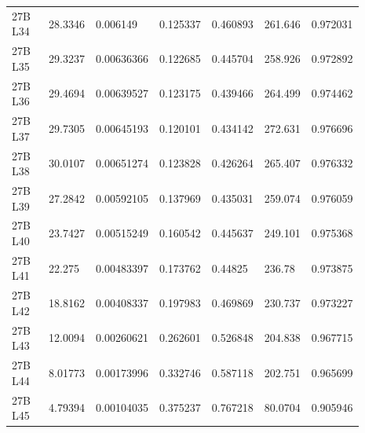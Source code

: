 \begin{longtable}{@{}L{0.13\linewidth}L{0.11\linewidth}L{0.13\linewidth}L{0.13\linewidth}L{0.13\linewidth}L{0.13\linewidth}L{0.13\linewidth}@{}}
27B L34 & 28.3346 & 0.006149 & 0.125337 & 0.460893 & 261.646 & 0.972031 \\
27B L35 & 29.3237 & 0.00636366 & 0.122685 & 0.445704 & 258.926 & 0.972892 \\
27B L36 & 29.4694 & 0.00639527 & 0.123175 & 0.439466 & 264.499 & 0.974462 \\
27B L37 & 29.7305 & 0.00645193 & 0.120101 & 0.434142 & 272.631 & 0.976696 \\
27B L38 & 30.0107 & 0.00651274 & 0.123828 & 0.426264 & 265.407 & 0.976332 \\
27B L39 & 27.2842 & 0.00592105 & 0.137969 & 0.435031 & 259.074 & 0.976059 \\
27B L40 & 23.7427 & 0.00515249 & 0.160542 & 0.445637 & 249.101 & 0.975368 \\
27B L41 & 22.275 & 0.00483397 & 0.173762 & 0.44825 & 236.78 & 0.973875 \\
27B L42 & 18.8162 & 0.00408337 & 0.197983 & 0.469869 & 230.737 & 0.973227 \\
27B L43 & 12.0094 & 0.00260621 & 0.262601 & 0.526848 & 204.838 & 0.967715 \\
27B L44 & 8.01773 & 0.00173996 & 0.332746 & 0.587118 & 202.751 & 0.965699 \\
27B L45 & 4.79394 & 0.00104035 & 0.375237 & 0.767218 & 80.0704 & 0.905946 \\
\end{longtable}

